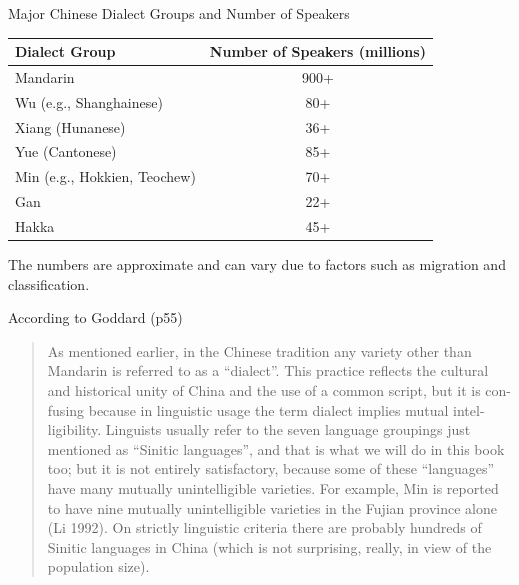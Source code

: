 \documentclass{beamer}
\begin{document}
\begin{frame}{Major Chinese Dialect Groups and Number of Speakers}
  \begin{center}
\begin{tabular}{lc}
\hline
\textbf{Dialect Group} & \textbf{Number of Speakers (millions)} \\ \hline
Mandarin & 900+ \\ \hline
Wu (e.g., Shanghainese) & 80+ \\ \hline
Xiang (Hunanese) & 36+ \\ \hline
Yue (Cantonese) & 85+ \\ \hline
Min (e.g., Hokkien, Teochew) & 70+ \\ \hline
Gan & 22+ \\ \hline
Hakka & 45+ \\ \hline
\end{tabular}

\end{center}

The numbers are approximate and can vary due to factors such as migration and classification. 
\end{frame}

\begin{frame}
  According to Goddard (p55)
  \begin{quote}
    As mentioned earlier, in the Chinese tradition any variety other
than Mandarin is referred to as a ``dialect''. This practice reﬂects the cultural
and historical unity of China and the use of a common script, but it is con-
fusing because in linguistic usage the term dialect implies mutual intel-
ligibility. Linguists usually refer to the seven language groupings just
mentioned as ``Sinitic languages'', and that is what we will do in this book too;
but it is not entirely satisfactory, because some of these ``languages'' have
many mutually unintelligible varieties. For example, Min is reported to
have nine mutually unintelligible varieties in the Fujian province alone
(Li 1992). On strictly linguistic criteria there are probably hundreds of Sinitic
languages in China (which is not surprising, really, in view of the population
size).
  \end{quote}
\end{frame}
\end{document}
